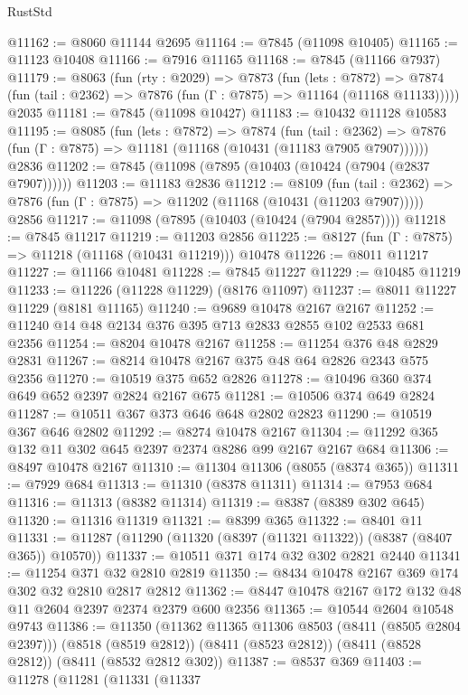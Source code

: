 \begin{lexlean}{RustStd}
\begin{coremodule}
@11162 := @8060 @11144 @2695
@11164 := @7845 (@11098 @10405)
@11165 := @11123 @10408
@11166 := @7916 @11165
@11168 := @7845 (@11166 @7937)
@11179 := @8063
    (fun (rty : @2029) =>
    @7873
      (fun (lets : @7872) =>
      @7874 (fun (tail : @2362) => @7876 (fun (Γ : @7875) => @11164 (@11168 @11133)))))
    @2035
@11181 := @7845 (@11098 @10427)
@11183 := @10432 @11128 @10583
@11195 := @8085
    (fun (lets : @7872) =>
    @7874
      (fun (tail : @2362) =>
      @7876 (fun (Γ : @7875) => @11181 (@11168 (@10431 (@11183 @7905 @7907))))))
    @2836
@11202 := @7845 (@11098 (@7895 (@10403 (@10424 (@7904 (@2837 @7907))))))
@11203 := @11183 @2836
@11212 := @8109
    (fun (tail : @2362) => @7876 (fun (Γ : @7875) => @11202 (@11168 (@10431 (@11203 @7907)))))
    @2856
@11217 := @11098 (@7895 (@10403 (@10424 (@7904 @2857))))
@11218 := @7845 @11217
@11219 := @11203 @2856
@11225 := @8127 (fun (Γ : @7875) => @11218 (@11168 (@10431 @11219))) @10478
@11226 := @8011 @11217
@11227 := @11166 @10481
@11228 := @7845 @11227
@11229 := @10485 @11219
@11233 := @11226 (@11228 @11229) (@8176 @11097)
@11237 := @8011 @11227 @11229 (@8181 @11165)
@11240 := @9689 @10478 @2167 @2167
@11252 := @11240 @14 @48 @2134 @376 @395 @713 @2833 @2855 @102 @2533 @681 @2356
@11254 := @8204 @10478 @2167
@11258 := @11254 @376 @48 @2829 @2831
@11267 := @8214 @10478 @2167 @375 @48 @64 @2826 @2343 @575 @2356
@11270 := @10519 @375 @652 @2826
@11278 := @10496 @360 @374 @649 @652 @2397 @2824 @2167 @675
@11281 := @10506 @374 @649 @2824
@11287 := @10511 @367 @373 @646 @648 @2802 @2823
@11290 := @10519 @367 @646 @2802
@11292 := @8274 @10478 @2167
@11304 := @11292 @365 @132 @11 @302 @645 @2397 @2374 @8286 @99 @2167 @2167 @684
@11306 := @8497 @10478 @2167
@11310 := @11304 @11306 (@8055 (@8374 @365))
@11311 := @7929 @684
@11313 := @11310 (@8378 @11311)
@11314 := @7953 @684
@11316 := @11313 (@8382 @11314)
@11319 := @8387 (@8389 @302 @645)
@11320 := @11316 @11319
@11321 := @8399 @365
@11322 := @8401 @11
@11331 := @11287 (@11290 (@11320 (@8397 (@11321 @11322)) (@8387 (@8407 @365)) @10570))
@11337 := @10511 @371 @174 @32 @302 @2821 @2440
@11341 := @11254 @371 @32 @2810 @2819
@11350 := @8434 @10478 @2167 @369 @174 @302 @32 @2810 @2817 @2812
@11362 := @8447 @10478 @2167 @172 @132 @48 @11 @2604 @2397 @2374 @2379 @600 @2356
@11365 := @10544 @2604 @10548 @9743
@11386 := @11350
    (@11362 @11365 @11306 @8503 (@8411 (@8505 @2804 @2397)))
    (@8518 (@8519 @2812))
    (@8411 (@8523 @2812))
    (@8411 (@8528 @2812))
    (@8411 (@8532 @2812 @302))
@11387 := @8537 @369
@11403 := @11278
    (@11281
      (@11331
        (@11337

\end{coremodule}
\end{lexlean}
